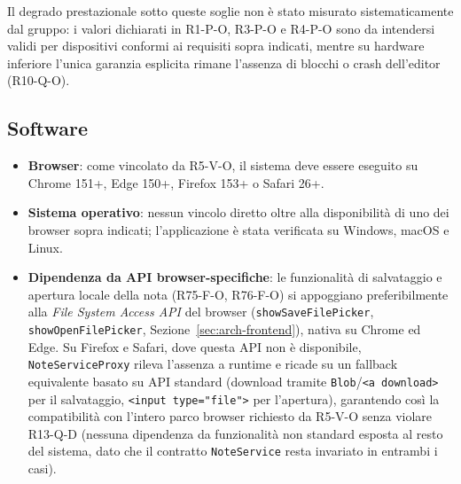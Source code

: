 Il degrado prestazionale sotto queste soglie non è stato misurato sistematicamente dal gruppo: i valori dichiarati in R1-P-O, R3-P-O e R4-P-O sono da intendersi validi per dispositivi conformi ai requisiti sopra indicati, mentre su hardware inferiore l'unica garanzia esplicita rimane l'assenza di blocchi o crash dell'editor (R10-Q-O).

\subsection{Software}
\begin{itemize}
	\item \textbf{Browser}: come vincolato da R5-V-O, il sistema deve essere eseguito su Chrome 151+, Edge 150+, Firefox 153+ o Safari 26+.
	\item \textbf{Sistema operativo}: nessun vincolo diretto oltre alla disponibilità di uno dei browser sopra indicati; l'applicazione è stata verificata su Windows, macOS e Linux.
	\item \textbf{Dipendenza da API browser-specifiche}: le funzionalità di salvataggio e apertura locale della nota (R75-F-O, R76-F-O) si appoggiano preferibilmente alla \textit{File System Access API} del browser (\texttt{showSaveFilePicker}, \texttt{showOpenFilePicker}, Sezione~\ref{sec:arch-frontend}), nativa su Chrome ed Edge. Su Firefox e Safari, dove questa API non è disponibile, \texttt{NoteServiceProxy} rileva l'assenza a runtime e ricade su un fallback equivalente basato su API standard (download tramite \texttt{Blob}/\texttt{<a download>} per il salvataggio, \texttt{<input type="file">} per l'apertura), garantendo così la compatibilità con l'intero parco browser richiesto da R5-V-O senza violare R13-Q-D (nessuna dipendenza da funzionalità non standard esposta al resto del sistema, dato che il contratto \texttt{NoteService} resta invariato in entrambi i casi).
\end{itemize}

